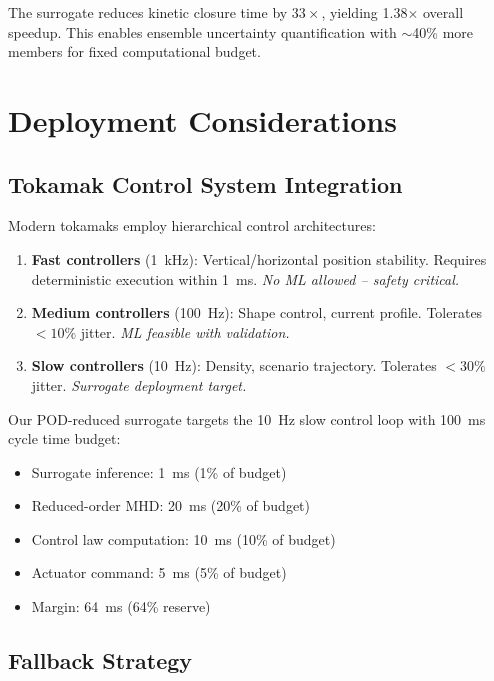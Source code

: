 \documentclass[12pt]{article}
\begin{document}
The surrogate reduces kinetic closure time by $33\times$, yielding 1.38$\times$ overall speedup. This enables ensemble uncertainty quantification with $\sim$40\% more members for fixed computational budget.

\section{Deployment Considerations}
\label{sec:deployment}

\subsection{Tokamak Control System Integration}

Modern tokamaks employ hierarchical control architectures:

\begin{enumerate}
\item \textbf{Fast controllers} (\SI{1}{\kilo\hertz}): Vertical/horizontal position stability. Requires deterministic execution within \SI{1}{\milli\second}. \textit{No ML allowed -- safety critical.}

\item \textbf{Medium controllers} (\SI{100}{\hertz}): Shape control, current profile. Tolerates $< 10\%$ jitter. \textit{ML feasible with validation.}

\item \textbf{Slow controllers} (\SI{10}{\hertz}): Density, scenario trajectory. Tolerates $< 30\%$ jitter. \textit{Surrogate deployment target.}
\end{enumerate}

Our POD-reduced surrogate targets the \SI{10}{\hertz} slow control loop with \SI{100}{\milli\second} cycle time budget:

\begin{itemize}
\item Surrogate inference: \SI{1}{\milli\second} (1\% of budget)
\item Reduced-order MHD: \SI{20}{\milli\second} (20\% of budget)
\item Control law computation: \SI{10}{\milli\second} (10\% of budget)
\item Actuator command: \SI{5}{\milli\second} (5\% of budget)
\item Margin: \SI{64}{\milli\second} (64\% reserve)
\end{itemize}

\subsection{Fallback Strategy}
\end{document}
